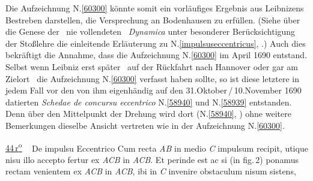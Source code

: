 \begin{ledgroup}
Die Aufzeichnung N.\;\ref{60300} könnte somit ein vorläufiges Ergebnis aus Leibnizens Bestreben darstellen, die Versprechung an Bodenhausen zu erfüllen.
(Siehe über die Genese der \textendash\ nie vollendeten \textendash\ \textit{Dynamica}\cite{01354} unter besonderer Berücksichtigung der Stoßlehre die einleitende Erläuterung zu N.\;\ref{impulsuseccentricus}, .)
Auch dies bekräftigt die Annahme, dass die Aufzeichnung N.\;\ref{60300} im April 1690 entstand.
\pend%
\pstart%
Selbst wenn Leibniz erst später \textendash\ auf der Rückfahrt nach Hannover oder gar am Zielort \textendash\ die Aufzeichnung N.\;\ref{60300} verfasst haben sollte, so ist diese letztere in jedem Fall vor den von ihm eigenhändig auf den 31.\;Okto\-ber\,/\,10.\;November 1690 datierten \textit{Schedae de concursu eccentrico} N.\;\ref{58940} und N.\;\ref{58939} entstanden.
Denn über den Mittelpunkt der Drehung wird dort (N.\;\ref{58940}, ) ohne weitere Bemerkungen dieselbe Ansicht vertreten wie in der Aufzeichnung N.\;\ref{60300}.
\pend%
\end{ledgroup}%
%
\frenchspacing%
\newpage%
\pstart%
\normalsize%
\noindent%
\lbrack%
\href{\Scan{LH_37_05_044r}}%
{44\,r\textsuperscript{o}}%
\rbrack\ %
\hfill%
De impulsu Eccentrico%
%
\hfill%
%
\pend%
\vspace{1.0em}%
\pstart%
\noindent%
Cum recta \textit{AB}%
in medio \textit{C} impulsum recipit,%
utique nisu%
illo accepto fer\-tur ex
\textit{ACB}
in \textit{ACB}.
Et perinde est
ac si%
(in fig.\,2) ponamus rectam%
venientem ex
\textit{ACB}
in \textit{ACB},
ibi in \textit{C} invenire obstaculum nisum sistens,%
